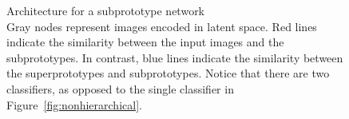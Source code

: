 \begin{figure}[hb]
    \centering
    
    \caption{Architecture for a subprototype network\\ {\normalfont Gray nodes represent images encoded in latent space. {\color{red} Red} lines indicate the similarity between the input images and the subprototypes. In contrast, {\color{blue} blue} lines indicate the similarity between the superprototypes and subprototypes. Notice that there are two classifiers, as opposed to the single classifier in Figure~\ref{fig:nonhierarchical}.}}
    \label{fig:hierarchical}
\end{figure}
